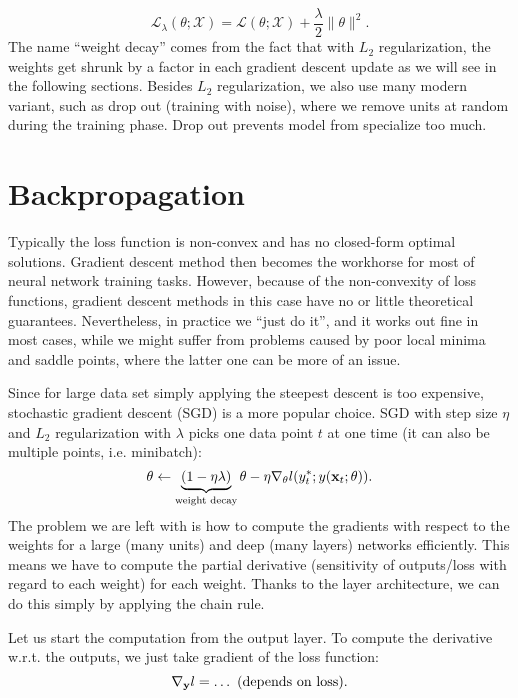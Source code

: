 \documentclass[../main.tex]{subfiles}
\begin{document}
\begin{equation*}
\mathcal{L}_{\lambda}(\theta;\mathcal{X}) = \mathcal{L}(\theta;\mathcal{X}) + \frac{\lambda}{2}\|\theta\|^2.
\end{equation*} 
The name ``weight decay'' comes from the fact that with $L_2$ regularization, the weights get shrunk by a factor in each gradient descent update as we will see in the following sections. Besides $L_2$ regularization, we also use many modern variant, such as drop out (training with noise), where we remove units at random during the training phase. Drop out prevents model from specialize too much.
\section{Backpropagation}
Typically the loss function is non-convex and has no closed-form optimal solutions. Gradient descent method then becomes the workhorse for most of neural network training tasks. However, because of the non-convexity of loss functions, gradient descent methods in this case have no or little theoretical guarantees. Nevertheless, in practice we ``just do it'', and it works out fine in most cases, while we might suffer from problems caused by poor local minima and saddle points, where the latter one can be more of an issue.
\par Since for large data set simply applying the steepest descent is too expensive, stochastic gradient descent (SGD) is a more popular choice. SGD with step size $\eta$ and $L_2$ regularization with $\lambda$ picks one data point $t$ at one time (it can also be multiple points, i.e. minibatch):
\begin{equation*}
\theta\leftarrow \underbrace{(1-\eta\lambda)}_{\text{weight decay}}\theta - \eta\nabla_{\theta}l(y_t^*;y({\bf x}_t;\theta)).
\end{equation*}
The problem we are left with is how to compute the gradients with respect to the weights for a large (many units) and deep (many layers) networks efficiently. This means we have to compute the partial derivative (sensitivity of outputs/loss with regard to each weight) for each weight. Thanks to the layer architecture, we can do this simply by applying the chain rule.
\par Let us start the computation from the output layer. To compute the derivative w.r.t. the outputs, we just take gradient of the loss function:
\begin{equation*}
\nabla_{\bf y}l = \dots\ \text{(depends on loss)}.
\end{equation*}
\end{document}
